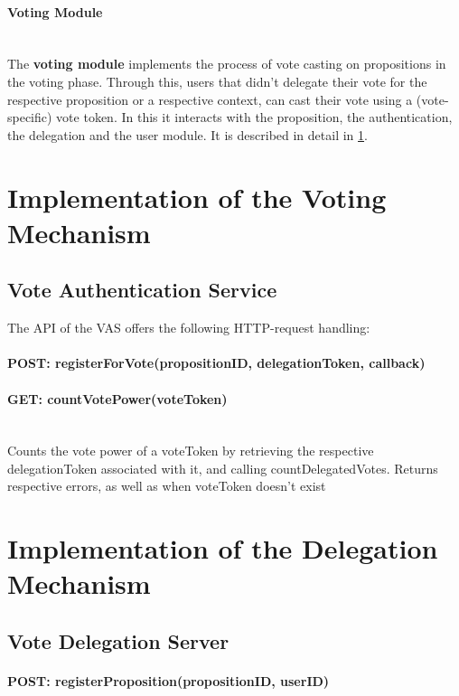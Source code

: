 \paragraph{Voting Module} \mbox{} \\
The \textbf{voting module} implements the process of vote casting on propositions in the voting phase. Through this, users that didn't delegate their vote for the respective proposition or a respective context, can cast their vote using a (vote-specific) vote token.
In this it interacts with the proposition, the authentication, the delegation and the user module. It is described in detail in \ref{sec:Implementation_Voting}.

\section{Implementation of the Voting Mechanism}
\label{sec:Implementation_Voting}


\subsection{Vote Authentication Service}
The API of the VAS offers the following HTTP-request handling:

\paragraph*{POST: registerForVote(propositionID, delegationToken, callback)}

\paragraph*{GET: countVotePower(voteToken)} \mbox{} \\
Counts the vote power of a voteToken by retrieving the respective delegationToken associated with it, and calling countDelegatedVotes.
Returns respective errors, as well as when voteToken doesn't exist

\section{Implementation of the Delegation Mechanism}

\subsection{Vote Delegation Server}

\paragraph*{POST: registerProposition(propositionID, userID)} \mbox{} \\


